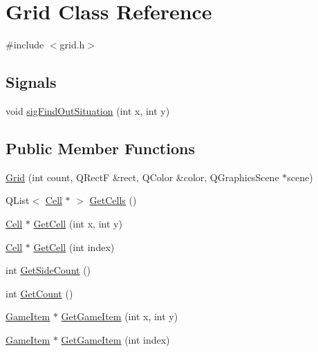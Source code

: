 \hypertarget{class_grid}{
\section{Grid Class Reference}
\label{class_grid}
}


{\ttfamily \#include $<$grid.h$>$}

\subsection*{Signals}
\begin{DoxyCompactItemize}
\item 
void \hyperlink{class_grid_a581161c966eab422f6a0ee5c89141c5e}{sigFindOutSituation} (int x, int y)
\end{DoxyCompactItemize}
\subsection*{Public Member Functions}
\begin{DoxyCompactItemize}
\item 
\hyperlink{class_grid_ade86a7ed28d2616b98bee6ce90486e1e}{Grid} (int count, QRectF \&rect, QColor \&color, QGraphicsScene $\ast$scene)
\item 
QList$<$ \hyperlink{class_cell}{Cell} $\ast$ $>$ \hyperlink{class_grid_aaacd0abb210696e0d63bcb60c2bef62b}{GetCells} ()
\item 
\hyperlink{class_cell}{Cell} $\ast$ \hyperlink{class_grid_a823660581fb7d3e06bfb2a0cb51c4d4b}{GetCell} (int x, int y)
\item 
\hyperlink{class_cell}{Cell} $\ast$ \hyperlink{class_grid_aef800d1c5fe482616fe4b39a405010eb}{GetCell} (int index)
\item 
int \hyperlink{class_grid_a9e62412a040a2d43e44d355715dea8d6}{GetSideCount} ()
\item 
int \hyperlink{class_grid_aa197aeabf720e86f90c45197230b984c}{GetCount} ()
\item 
\hyperlink{class_game_item}{GameItem} $\ast$ \hyperlink{class_grid_a1575c3a8902576b3fc09ca8c9b2744e8}{GetGameItem} (int x, int y)
\item 
\hyperlink{class_game_item}{GameItem} $\ast$ \hyperlink{class_grid_a7746eff0c272ac6660a84ad219830719}{GetGameItem} (int index)
\end{DoxyCompactItemize}
